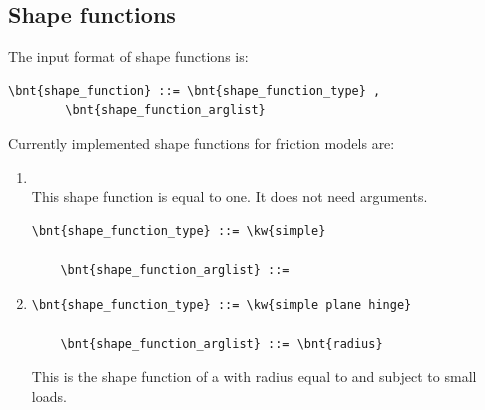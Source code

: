\subsection{Shape functions}
The input format of shape functions is:
\begin{Verbatim}[commandchars=\\\{\}]
    \bnt{shape_function} ::= \bnt{shape_function_type} ,
        \bnt{shape_function_arglist}
\end{Verbatim}
Currently implemented shape functions for friction models are:
\begin{enumerate}
    \item {}\\
    This shape function is equal to one. It does not need arguments.
\begin{Verbatim}[commandchars=\\\{\}]
    \bnt{shape_function_type} ::= \kw{simple}

    \bnt{shape_function_arglist} ::=
\end{Verbatim}

    \item {}
\begin{Verbatim}[commandchars=\\\{\}]
    \bnt{shape_function_type} ::= \kw{simple plane hinge}

    \bnt{shape_function_arglist} ::= \bnt{radius}
\end{Verbatim}
    This is the shape function of a  with radius equal to 
     and subject to small loads.
\end{enumerate}



